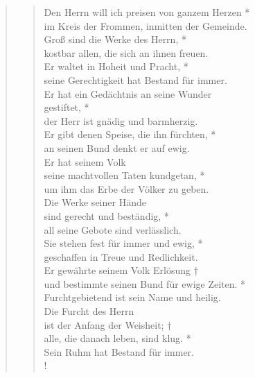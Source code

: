 \begin{quote}
\begin{verse}

Den Herrn will ich preisen von ganzem Herzen *\\
im Kreis der Frommen, inmitten der Gemeinde.\\
\vin Groß sind die Werke des Herrn, *\\
\vin kostbar allen, die sich an ihnen freuen.\\
Er waltet in Hoheit und Pracht, *\\
seine Gerechtigkeit hat Bestand für immer.\\
\vin Er hat ein Gedächtnis an seine Wunder\\ 
\vin gestiftet, *\\
\vin der Herr ist gnädig und barmherzig.\\
Er gibt denen Speise, die ihn fürchten, *\\
an seinen Bund denkt er auf ewig.\\
\vin Er hat seinem Volk\\
\vin seine machtvollen Taten kundgetan, *\\
\vin um ihm das Erbe der Völker zu geben. \\
Die Werke seiner Hände\\
sind gerecht und beständig, *\\
all seine Gebote sind verlässlich.\\
\vin Sie stehen fest für immer und ewig, *\\
\vin geschaffen in Treue und Redlichkeit.\\
Er gewährte seinem Volk Erlösung †\\
und bestimmte seinen Bund für ewige Zeiten. *\\
Furchtgebietend ist sein Name und heilig. \\
\vin Die Furcht des Herrn\\ 
\vin ist der Anfang der Weisheit; †\\
\vin alle, die danach leben, sind klug. *\\
\vin Sein Ruhm hat Bestand für immer.\\!

\end{verse}
 
\end{quote}

\vspace{0.3cm}


